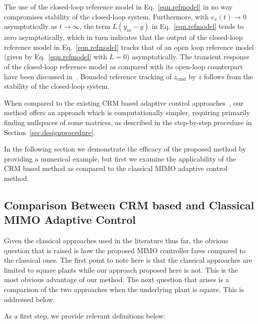 \documentclass[]{../sty/JGCD}
\theoremstyle{examplestyle}
\begin{document}
  \begin{rem-dan}
    The use of the closed-loop reference model in Eq.\ \eqref{eqn.refmodel} in no way compromises stability of the closed-loop system.
    Furthermore, with $e_{x}(t)\rightarrow0$ asymptotically as $t\rightarrow\infty$, the term $L(y_{m}-y)$ in Eq.\ \eqref{eqn.refmodel} tends to zero asymptotically, which in turn indicates that the output of the closed-loop reference model in Eq.\ \eqref{eqn.refmodel} tracks that of an open loop reference model (given by Eq.\ \eqref{eqn.refmodel} with $L=0$) asymptotically.
    The transient response of the closed-loop reference model as compared with its open-loop counterpart have been discussed in\ \cite{gibson.ieeeaccess.2013,gibson.acc.2013}.
    Bounded reference tracking of $z_{\text{cmd}}$ by $z$ follows from  the stability of the closed-loop system.
  \end{rem-dan}

  \begin{rem-dan}
    When compared to the existing CRM based adaptive control approaches\ \cite{lavretsky.output.2010,qu.gnc.2013,lavretskywise.book.2013}, our method offers an approach which is computationally simpler, requiring primarily finding nullspaces of some matrices, as described in the step-by-step procedure in Section~\ref{sec.designprocedure}.
  \end{rem-dan}

  In the following section we demonstrate the efficacy of the proposed method by providing a numerical example, but first we examine the applicability of the CRM based method as compared to the classical MIMO adaptive control method.

  \subsection{Comparison Between CRM based and Classical MIMO Adaptive Control}

  Given the classical approaches used in the  literature thus far, the obvious question that is raised is how the proposed MIMO controller fares compared to the classical ones.
  The first point to note here is that the classical approaches are limited to square plants while our approach proposed here is not.
  This is the most obvious advantage of our method.
  The next question that arises is a comparison of the two approaches when the underlying plant is square.
  This is addressed below.

  As a first step, we provide relevant definitions below:
\end{document}
